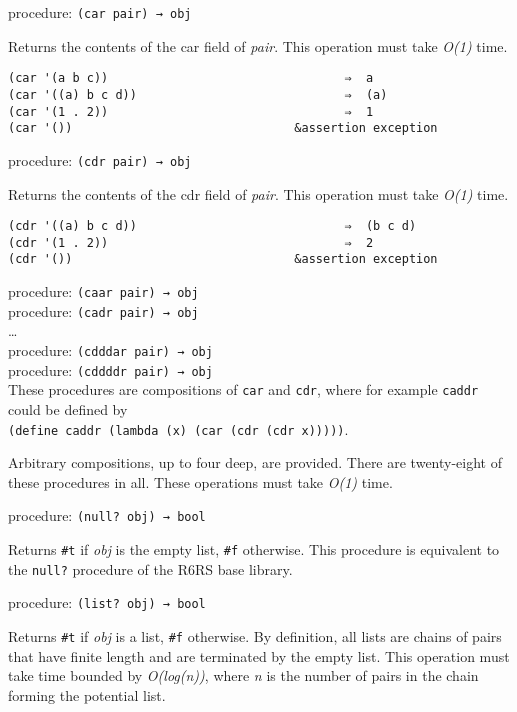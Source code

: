 procedure: \texttt{(car\ pair)\ →\ obj}

Returns the contents of the car field of \emph{pair}. This operation
must take \emph{O(1)} time.

\begin{verbatim}
(car '(a b c))                                 ⇒  a
(car '((a) b c d))                             ⇒  (a)
(car '(1 . 2))                                 ⇒  1
(car '())                               &assertion exception
\end{verbatim}

procedure: \texttt{(cdr\ pair)\ →\ obj}

Returns the contents of the cdr field of \emph{pair}. This operation
must take \emph{O(1)} time.

\begin{verbatim}
(cdr '((a) b c d))                             ⇒  (b c d)
(cdr '(1 . 2))                                 ⇒  2
(cdr '())                               &assertion exception
\end{verbatim}

procedure: \texttt{(caar\ pair)\ →\ obj}\\
procedure: \texttt{(cadr\ pair)\ →\ obj}\\
\ldots{}\\
procedure: \texttt{(cdddar\ pair)\ →\ obj}\\
procedure: \texttt{(cddddr\ pair)\ →\ obj}\\

These procedures are compositions of \texttt{car} and \texttt{cdr},
where for example \texttt{caddr} could be defined by\\
\texttt{(define\ caddr\ (lambda\ (x)\ (car\ (cdr\ (cdr\ x)))))}.

Arbitrary compositions, up to four deep, are provided. There are
twenty-eight of these procedures in all. These operations must take
\emph{O(1)} time.

procedure: \texttt{(null?\ obj)\ →\ bool}

Returns \texttt{\#t} if \emph{obj} is the empty list, \texttt{\#f}
otherwise. This procedure is equivalent to the \texttt{null?} procedure
of the R6RS base library.

procedure: \texttt{(list?\ obj)\ →\ bool}

Returns \texttt{\#t} if \emph{obj} is a list, \texttt{\#f} otherwise. By
definition, all lists are chains of pairs that have finite length and
are terminated by the empty list. This operation must take time bounded
by \emph{O(log(n))}, where \emph{n} is the number of pairs in the chain
forming the potential list.

